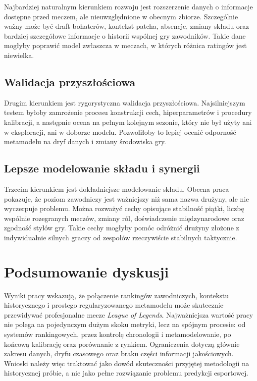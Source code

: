 Najbardziej naturalnym kierunkiem rozwoju jest rozszerzenie danych o informacje dostępne przed
meczem, ale nieuwzględnione w obecnym zbiorze. Szczególnie ważny może być draft bohaterów, kontekst
patcha, absencje, zmiany składu oraz bardziej szczegółowe informacje o historii wspólnej gry
zawodników. Takie dane mogłyby poprawić model zwłaszcza w meczach, w których różnica ratingów jest
niewielka.

\subsection{Walidacja przyszłościowa}

Drugim kierunkiem jest rygorystyczna walidacja przyszłościowa. Najsilniejszym testem byłoby
zamrożenie procesu konstrukcji cech, hiperparametrów i procedury kalibracji, a następnie ocena na
pełnym kolejnym sezonie, który nie był użyty ani w eksploracji, ani w doborze modelu. Pozwoliłoby to
lepiej ocenić odporność metamodelu na dryf danych i zmiany środowiska gry.

\subsection{Lepsze modelowanie składu i synergii}

Trzecim kierunkiem jest dokładniejsze modelowanie składu. Obecna praca pokazuje, że poziom
zawodniczy jest ważniejszy niż sama nazwa drużyny, ale nie wyczerpuje problemu. Można rozważyć cechy
opisujące stabilność piątki, liczbę wspólnie rozegranych meczów, zmiany ról, doświadczenie
międzynarodowe oraz zgodność stylów gry. Takie cechy mogłyby pomóc odróżnić drużyny złożone z
indywidualnie silnych graczy od zespołów rzeczywiście stabilnych taktycznie.

\section{Podsumowanie dyskusji}

Wyniki pracy wskazują, że połączenie rankingów zawodniczych, kontekstu historycznego i prostego
regularyzowanego metamodelu może skutecznie przewidywać profesjonalne mecze \textit{League of
Legends}. Najważniejsza wartość pracy nie polega na pojedynczym dużym skoku metryki, lecz na spójnym
procesie: od systemów rankingowych, przez kontrolę chronologii i metamodelowanie, po końcową
kalibrację oraz porównanie z rynkiem. Ograniczenia dotyczą głównie zakresu danych, dryfu czasowego
oraz braku części informacji jakościowych. Wnioski należy więc traktować jako dowód skuteczności
przyjętej metodologii na historycznej próbie, a nie jako pełne rozwiązanie problemu predykcji
esportowej.
